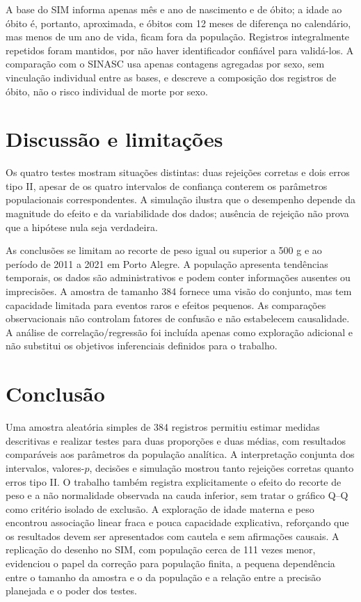 \documentclass[12pt,a4paper]{article}
\begin{document}
A base do SIM informa apenas mês e ano de nascimento e de óbito; a idade ao óbito é, portanto, aproximada, e óbitos com 12 meses de diferença no calendário, mas menos de um ano de vida, ficam fora da população. Registros integralmente repetidos foram mantidos, por não haver identificador confiável para validá-los. A comparação com o SINASC usa apenas contagens agregadas por sexo, sem vinculação individual entre as bases, e descreve a composição dos registros de óbito, não o risco individual de morte por sexo.

\section{Discussão e limitações}

Os quatro testes mostram situações distintas: duas rejeições corretas e dois erros tipo II, apesar de os quatro intervalos de confiança conterem os parâmetros populacionais correspondentes. A simulação ilustra que o desempenho depende da magnitude do efeito e da variabilidade dos dados; ausência de rejeição não prova que a hipótese nula seja verdadeira.

As conclusões se limitam ao recorte de peso igual ou superior a 500 g e ao período de 2011 a 2021 em Porto Alegre. A população apresenta tendências temporais, os dados são administrativos e podem conter informações ausentes ou imprecisões. A amostra de tamanho 384 fornece uma visão do conjunto, mas tem capacidade limitada para eventos raros e efeitos pequenos. As comparações observacionais não controlam fatores de confusão e não estabelecem causalidade. A análise de correlação/regressão foi incluída apenas como exploração adicional e não substitui os objetivos inferenciais definidos para o trabalho.

\section{Conclusão}

Uma amostra aleatória simples de 384 registros permitiu estimar medidas descritivas e realizar testes para duas proporções e duas médias, com resultados comparáveis aos parâmetros da população analítica. A interpretação conjunta dos intervalos, valores-\(p\), decisões e simulação mostrou tanto rejeições corretas quanto erros tipo II. O trabalho também registra explicitamente o efeito do recorte de peso e a não normalidade observada na cauda inferior, sem tratar o gráfico Q--Q como critério isolado de exclusão. A exploração de idade materna e peso encontrou associação linear fraca e pouca capacidade explicativa, reforçando que os resultados devem ser apresentados com cautela e sem afirmações causais. A replicação do desenho no SIM, com população cerca de 111 vezes menor, evidenciou o papel da correção para população finita, a pequena dependência entre o tamanho da amostra e o da população e a relação entre a precisão planejada e o poder dos testes.
\end{document}
